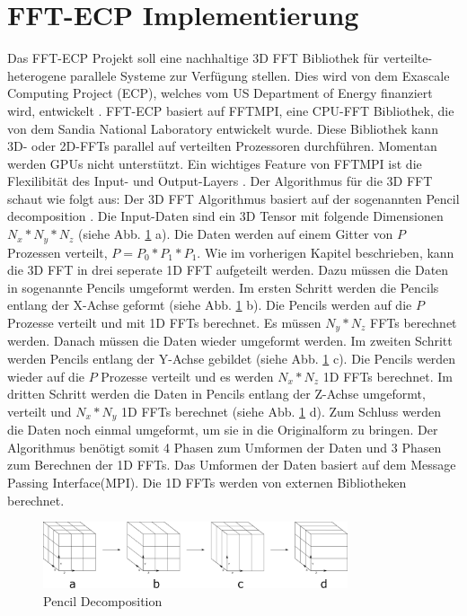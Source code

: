 \section{FFT-ECP Implementierung}
Das FFT-ECP Projekt soll eine nachhaltige 3D FFT Bibliothek für verteilte-heterogene parallele Systeme zur Verfügung stellen. Dies wird von dem Exascale Computing Project (ECP), welches vom US Department of Energy finanziert wird, entwickelt \cite[S. 1]{sha 19}. 
\newline
FFT-ECP basiert auf FFTMPI, eine CPU-FFT Bibliothek, die von dem Sandia National Laboratory entwickelt wurde. Diese Bibliothek kann 3D- oder 2D-FFTs parallel auf verteilten Prozessoren durchführen. Momentan werden GPUs nicht unterstützt. Ein wichtiges Feature von FFTMPI ist die Flexilibität des Input- und Output-Layers \cite[S.2]{sha 19}. 
\newline
Der Algorithmus für die 3D FFT schaut wie folgt aus:
\newline
Der 3D FFT Algorithmus basiert auf der sogenannten Pencil decomposition \cite[S.1-2]{aya 19}.
Die Input-Daten sind ein 3D Tensor mit folgende Dimensionen $N_{x} * N_{y} * N_{z}$ (siehe Abb. \ref{fig:pencildecomposition} a). Die Daten werden auf einem Gitter von $P$ Prozessen verteilt, $P=P_0 * P_1 * P_1$. Wie im vorherigen Kapitel beschrieben, kann die 3D FFT in drei seperate 1D FFT aufgeteilt werden. Dazu müssen die Daten in sogenannte Pencils umgeformt werden. 
\newline
Im ersten Schritt werden die Pencils entlang der X-Achse geformt (siehe Abb. \ref{fig:pencildecomposition} b). Die Pencils werden auf die $P$ Prozesse verteilt und mit 1D FFTs berechnet. Es müssen $N_y * N_{z}$ FFTs berechnet werden. Danach müssen die Daten wieder umgeformt werden. 
\newline
Im zweiten Schritt werden Pencils entlang der Y-Achse gebildet (siehe Abb. \ref{fig:pencildecomposition} c). Die Pencils werden wieder auf die $P$ Prozesse verteilt und es werden $N_x * N_z$ 1D FFTs berechnet. 
\newline
Im dritten Schritt werden die Daten in Pencils entlang der Z-Achse umgeformt, verteilt und $N_x * N_y$ 1D FFTs berechnet (siehe Abb. \ref{fig:pencildecomposition} d). Zum Schluss werden die Daten noch einmal umgeformt, um sie in die Originalform zu bringen. 
\newline
Der Algorithmus benötigt somit 4 Phasen zum Umformen der Daten und 3 Phasen zum Berechnen der 1D FFTs. Das Umformen der Daten basiert auf dem Message Passing Interface(MPI). Die 1D FFTs werden von externen Bibliotheken berechnet.

\begin{figure}
\centering
 \includegraphics[width=0.8\textwidth]{Pictures/PencilsDecomposition.png}
\caption{Pencil Decomposition}
\label{fig:pencildecomposition}
\end{figure} 





